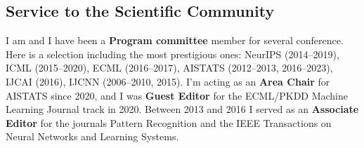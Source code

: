 \documentclass[oneside, a4paper, onecolumn, 10pt]{article}
\begin{document}



\subsection*{Service to the Scientific Community}

I am and I have been a {\bf Program committee} member for several conference. 
Here is a selection including the most prestigious ones:
  NeurIPS (2014--2019),
  ICML (2015--2020),
  ECML (2016--2017),
  AISTATS (2012--2013, 2016--2023), 
  IJCAI (2016),
  IJCNN (2006--2010, 2015).
I'm acting as an {\bf Area Chair} for AISTATS since 2020, and I was {\bf Guest Editor} for the ECML/PKDD Machine Learning Journal track in 2020.
Between 2013 and 2016 I served as an {\bf Associate Editor} for the journals Pattern Recognition and the IEEE Transactions on Neural Networks and Learning Systems.





\end{document}
